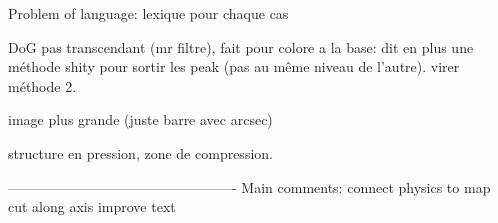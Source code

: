 Problem of language: lexique pour chaque cas

DoG pas transcendant (mr filtre), fait pour colore a la base: dit en plus une méthode shity pour sortir les peak (pas au même niveau de l'autre). virer méthode 2.

image plus grande (juste barre avec arcsec)

structure en pression, zone de compression.

-------------------------------------------------
Main comments: connect physics to map
cut along axis
improve text


